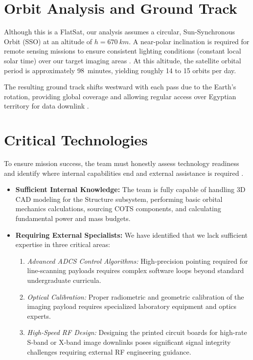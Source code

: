 ﻿\documentclass[12pt,a4paper]{report}
\begin{document}
\section{Orbit Analysis and Ground Track}
Although this is a FlatSat, our analysis assumes a circular, Sun-Synchronous Orbit (SSO) at an altitude of $h = \SI{670}{km}$. A near-polar inclination is required for remote sensing missions to ensure consistent lighting conditions (constant local solar time) over our target imaging areas \cite{smad3}. At this altitude, the satellite orbital period is approximately \SI{98}{minutes}, yielding roughly 14 to 15 orbits per day. 

The resulting ground track shifts westward with each pass due to the Earth's rotation, providing global coverage and allowing regular access over Egyptian territory for data downlink \cite{smad3}.


\section{Critical Technologies}
To ensure mission success, the team must honestly assess technology readiness and identify where internal capabilities end and external assistance is required \cite{smad3}.

\begin{itemize}
    \item \textbf{Sufficient Internal Knowledge:} The team is fully capable of handling 3D CAD modeling for the Structure subsystem, performing basic orbital mechanics calculations, sourcing COTS components, and calculating fundamental power and mass budgets.
    \item \textbf{Requiring External Specialists:} We have identified that we lack sufficient expertise in three critical areas:
    \begin{enumerate}
        \item \textit{Advanced ADCS Control Algorithms:} High-precision pointing required for line-scanning payloads requires complex software loops beyond standard undergraduate curricula.
        \item \textit{Optical Calibration:} Proper radiometric and geometric calibration of the imaging payload requires specialized laboratory equipment and optics experts.
        \item \textit{High-Speed RF Design:} Designing the printed circuit boards for high-rate S-band or X-band image downlinks poses significant signal integrity challenges requiring external RF engineering guidance.
    \end{enumerate}
\end{itemize}
\end{document}
